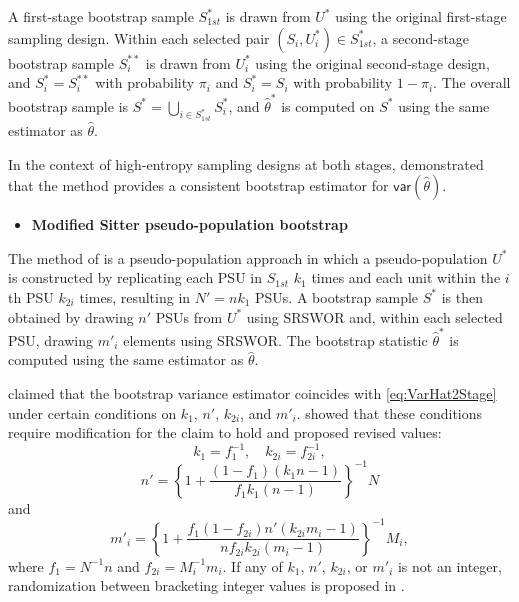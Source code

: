 A first-stage bootstrap sample \(\textrm{$S$}_{1st}^*\) is drawn from \(U^*\) using the original first-stage sampling design. Within each selected pair \((\textrm{$S$}_i, U_i^*) \in \textrm{$S$}_{1st}^*\), a second-stage bootstrap sample \(\textrm{$S$}_i^{**}\) is drawn from \(U_i^*\) using the original second-stage design, and \(\textrm{$S$}_i^* = \textrm{$S$}_i^{**}\) with probability \(\pi_i\) and \(\textrm{$S$}_i^* = \textrm{$S$}_i\) with probability \(1 - \pi_i\). The overall bootstrap sample is \(\textrm{$S$}^* = \bigcup_{i \in \textrm{$S$}_{1st}^*} \textrm{$S$}_i^*\), and \(\hat{\theta}^*\) is computed on \(\textrm{$S$}^*\) using the same estimator as \(\hat{\theta}\).

In the context of high-entropy sampling designs at both stages, \citet{Chauvet:2007} demonstrated that the method provides a consistent bootstrap estimator for \(\mathsf{var}(\hat{\theta})\).

\begin{itemize}
\tightlist
\item
  \textbf{Modified Sitter pseudo-population bootstrap}
\end{itemize}

\noindent The method of \citet{Sitter:1992a} is a pseudo-population approach in which a pseudo-population \(U^*\) is constructed by replicating each PSU in \(\textrm{$S$}_{1st}\) \(k_1\) times and each unit within the \(i\)th PSU \(k_{2i}\) times, resulting in \(N' = nk_1\) PSUs. A bootstrap sample \(\textrm{$S$}^*\) is then obtained by drawing \(n'\) PSUs from \(U^*\) using SRSWOR and, within each selected PSU, drawing \(m'_i\) elements using SRSWOR. The bootstrap statistic \(\hat{\theta}^*\) is computed using the same estimator as \(\hat{\theta}\).

\citet{Sitter:1992a} claimed that the bootstrap variance estimator coincides with \eqref{eq:VarHat2Stage} under certain conditions on \(k_1\), \(n'\), \(k_{2i}\), and \(m'_i\). \citet{Chen:Haziza:Mashreghi:2022} showed that these conditions require modification for the claim to hold and proposed revised values:
\[
   k_1=f_1^{-1},    \quad k_{2i}= f_{2i}^{-1},
\]
\[
    n' = \left\{ 1 + \frac{(1 - f_1)(k_1 n - 1)}{f_1 k_1 (n - 1)} \right\}^{-1} N
\]
and
\[
    m'_i = \left\{ 1 + \frac{f_1 (1 - f_{2i}) n' (k_{2i} m_i - 1)}{n f_{2i} k_{2i} (m_i - 1)} \right\}^{-1} M_i,
\]
where \(f_1 = N^{-1}n\) and \(f_{2i} = M_i^{-1} m_i\). If any of \(k_1\), \(n'\), \(k_{2i}\), or \(m'_i\) is not an integer, randomization between bracketing integer values is proposed in \citet{Sitter:1989}.

